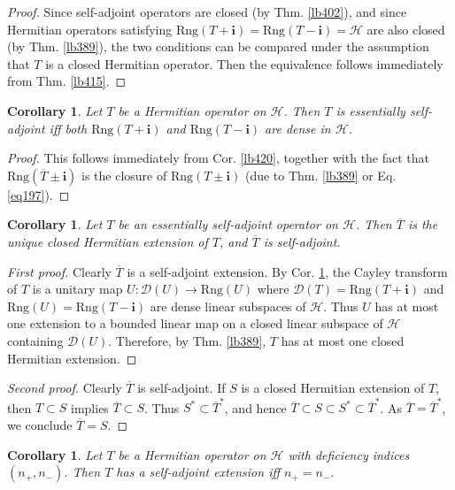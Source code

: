 \documentclass[12pt,b5paper,notitlepage]{article}
\theoremstyle{definition}
\theoremstyle{plain}
\newtheorem{co}[df]{Corollary}
\newcommand{\ovl}{\overline}
\newcommand{\Dom}{\mathscr{D}}
\newcommand{\im}{\mathbf{i}}
\newcommand{\Rng}{\mathrm{Rng}}
\newcommand{\MH}{\mathcal H}
\numberwithin{equation}{section}
\begin{document}
\begin{proof}
Since self-adjoint operators are closed (by Thm. \ref{lb402}), and since Hermitian operators satisfying $\Rng(T+\im)=\Rng(T-\im)=\MH$ are also closed (by Thm. \ref{lb389}), the two conditions can be compared under the assumption that $T$ is a closed Hermitian operator. Then the equivalence follows immediately from Thm. \ref{lb415}.
\end{proof}

\begin{co}\label{lb461}
Let $T$ be a Hermitian operator on $\MH$. Then $T$ is essentially self-adjoint iff both $\Rng(T+\im)$ and $\Rng(T-\im)$ are dense in $\MH$.
\end{co}

\begin{proof}
This follows immediately from Cor. \ref{lb420}, together with the fact that $\Rng(\ovl T\pm\im)$ is the closure of $\Rng(T\pm\im)$ (due to Thm. \ref{lb389} or Eq. \eqref{eq197}).
\end{proof}


\begin{co}\label{lb462}
Let $T$ be an essentially self-adjoint operator on $\MH$. Then $\ovl T$ is the unique closed Hermitian extension of $T$, and $\ovl T$ is self-adjoint.
\end{co}

\begin{proof}[First proof]
Clearly $\ovl T$ is a self-adjoint extension. By Cor. \ref{lb461}, the Cayley transform of $T$ is a unitary map $U:\Dom(U)\rightarrow\Rng(U)$ where $\Dom(T)=\Rng(T+\im)$ and $\Rng(U)=\Rng(T-\im)$ are dense linear subspaces of $\MH$. Thus $U$ has at most one extension to a bounded linear map on a closed linear subspace of $\MH$ containing $\Dom(U)$. Therefore, by Thm. \ref{lb389}, $T$ has at most one closed Hermitian extension.
\end{proof}

\begin{proof}[Second proof]
Clearly $\ovl T$ is self-adjoint. If $S$ is a closed Hermitian extension of $T$, then $T\subset S$ implies $\ovl T\subset S$. Thus $S^*\subset\ovl T^*$, and hence $\ovl T\subset S\subset S^*\subset \ovl T^*$. As $\ovl T=\ovl T^*$, we conclude $\ovl T=S$.
\end{proof}



\begin{co}\label{lb424}
Let $T$ be a Hermitian operator on $\MH$ with deficiency indices $(n_+,n_-)$. Then $T$ has a self-adjoint extension iff $n_+=n_-$.
\end{co}
\end{document}
